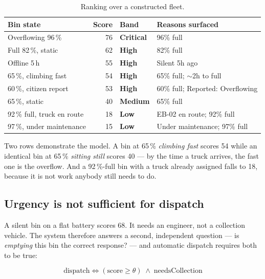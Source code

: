 \documentclass[11pt,a4paper]{article}
\begin{document}
\begin{table}[h]
\centering\small
\begin{tabularx}{\textwidth}{lrlX}
\toprule
\textbf{Bin state} & \textbf{Score} & \textbf{Band} & \textbf{Reasons surfaced} \\
\midrule
Overflowing 96\,\%          & 76 & \textcolor{crit}{\textbf{Critical}} & 96\% full \\
Full 82\,\%, static         & 62 & \textcolor{high}{\textbf{High}}     & 82\% full \\
Offline 5\,h                & 55 & \textcolor{high}{\textbf{High}}     & Silent 5h ago \\
65\,\%, climbing fast       & 54 & \textcolor{high}{\textbf{High}}     & 65\% full; $\sim$2h to full \\
60\,\%, citizen report      & 53 & \textcolor{high}{\textbf{High}}     & 60\% full; Reported: Overflowing \\
65\,\%, static              & 40 & \textcolor{med}{\textbf{Medium}}    & 65\% full \\
92\,\% full, truck en route & 18 & \textcolor{low}{\textbf{Low}}       & EB-02 en route; 92\% full \\
97\,\%, under maintenance   & 15 & \textcolor{low}{\textbf{Low}}       & Under maintenance; 97\% full \\
\bottomrule
\end{tabularx}
\caption{Ranking over a constructed fleet.}
\end{table}

Two rows demonstrate the model. A bin at 65\,\% \emph{climbing fast}
scores 54 while an identical bin at 65\,\% \emph{sitting still} scores 40
--- by the time a truck arrives, the fast one is the overflow. And a
92\,\%-full bin with a truck already assigned falls to 18, because it is
not work anybody still needs to do.

\subsection{Urgency is not sufficient for dispatch}

A silent bin on a flat battery scores 68. It needs an engineer, not a
collection vehicle. The system therefore answers a second, independent
question --- is \emph{emptying} this bin the correct response? --- and
automatic dispatch requires both to be true:

\[
\text{dispatch} \iff (\text{score} \geq \theta) \;\wedge\; \text{needsCollection}
\]
\end{document}
